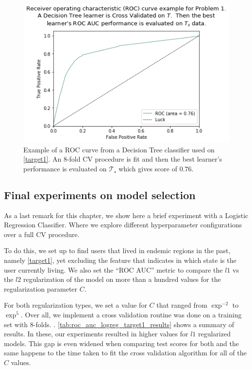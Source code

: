 \begin{figure}[h!]
\begin{center}
\includegraphics[width=1.2\columnwidth]{figures/figure-highROCAUC/figure-highROCAUC}
\caption{Example of a ROC curve from a Decision Tree classifier used on \cref{target1}. An 8-fold CV procedure is fit and then the best learner's performance is evaluated on $\mathcal{T_s}$ which gives score of $0.76$.}
\label{fg:highROCAUC}
\end{center}
\end{figure}


\subsection{Final experiments on model selection}\label{sub:final_model_selection}

As a last remark for this chapter, we show here a brief experiment with a Logistic Regression Classifier. Where we explore different hyperparameter configurations over a full CV procedure.

To do this, we set up to find users that lived in endemic regions in the past, namely \cref{target1}, yet excluding the feature that indicates in which state is the user currently living.
We also set the ``ROC AUC'' metric to compare the $l1$ vs the $l2$ regularization of the model on more than a hundred values for the regularization parameter $C$.

For both regularization types, we set a value for $C$ that ranged from $\exp^{-2}$ to $\exp^{5}$. Over all, we implement a cross validation routine was done on a training set with 8-folds.
.
\cref{tab:roc_auc_logreg_target1_results} shows a summary of results.
In these, our experiments resulted in higher values for $l1$ regularized models.
This gap is even widened when comparing test scores for both and the same happens to the time taken to fit the cross validation algorithm for all of the $C$ values.


